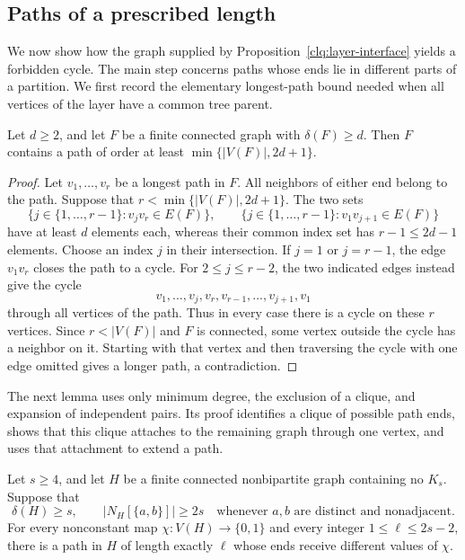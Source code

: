 \subsection{Paths of a prescribed length}

We now show how the graph supplied by
Proposition~\ref{clq:layer-interface} yields a forbidden cycle.
The main step concerns paths whose ends lie in different parts of a
partition.  We first record the elementary longest-path bound needed
when all vertices of the layer have a common tree parent.

\begin{lemma}\label{clq:long-path}
Let $d\ge 2$, and let $F$ be a finite connected graph with
$\delta(F)\ge d$.  Then $F$ contains a path of order at least
$\min\{|V(F)|,2d+1\}$.
\end{lemma}

\begin{proof}
Let $v_1,\ldots,v_r$ be a longest path in $F$.  All neighbors of either
end belong to the path.  Suppose that
$r<\min\{|V(F)|,2d+1\}$.  The two sets
\[
 \{j\in\{1,\ldots,r-1\}:v_jv_r\in E(F)\},\qquad
 \{j\in\{1,\ldots,r-1\}:v_1v_{j+1}\in E(F)\}
\]
have at least $d$ elements each, whereas their common index set has
$r-1\le 2d-1$ elements.  Choose an index $j$ in their intersection.
If $j=1$ or $j=r-1$, the edge $v_1v_r$ closes the path to a cycle.
For $2\le j\le r-2$, the two indicated edges instead give the cycle
\[
 v_1,\ldots,v_j,v_r,v_{r-1},\ldots,v_{j+1},v_1
\]
through all vertices of the path.  Thus in every case there is a
cycle on these $r$ vertices.
Since $r<|V(F)|$ and $F$ is connected, some vertex outside the cycle
has a neighbor on it.  Starting with that vertex and then traversing
the cycle with one edge omitted gives a longer path, a contradiction.
\end{proof}

The next lemma uses only minimum degree, the exclusion of a clique,
and expansion of independent pairs.  Its proof identifies a clique of
possible path ends, shows that this clique attaches to the remaining
graph through one vertex, and uses that attachment to extend a path.

\begin{lemma}\label{clq:coloured-path}
Let $s\ge 4$, and let $H$ be a finite connected nonbipartite graph
containing no $K_s$.  Suppose that
\[
 \delta(H)\ge s,
 \qquad
 |N_H[\{a,b\}]|\ge 2s
 \quad\text{whenever $a,b$ are distinct and nonadjacent.}
\]
For every nonconstant map $\chi:V(H)\to\{0,1\}$ and every integer
$1\le\ell\le 2s-2$, there is a path in $H$ of length exactly $\ell$
whose ends receive different values of $\chi$.
\end{lemma}

